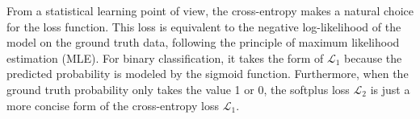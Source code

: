 \documentclass[sigconf,edbt]{acmart-edbt2019}
\begin{document}
From a statistical learning point of view, the cross-entropy makes a natural choice for the loss function. This loss is equivalent to the negative log-likelihood of the model on the ground truth data, following the principle of maximum likelihood estimation (MLE). For binary classification, it takes the form of $\mathcal{L}_1$ because the predicted probability is modeled by the sigmoid function. Furthermore, when the ground truth probability only takes the value 1 or 0, the softplus loss $\mathcal{L}_2$ is just a more concise form of the cross-entropy loss $\mathcal{L}_1$.
\end{document}
